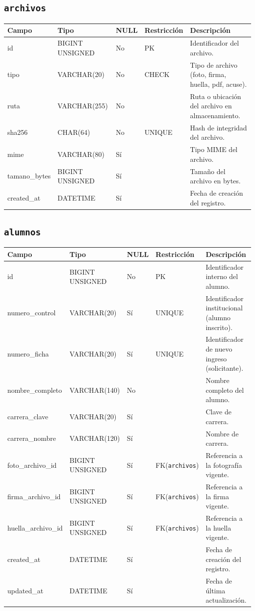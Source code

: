 \documentclass[12pt,a4paper]{article}
\begin{document}
\subsection{\texttt{archivos}}
\begin{longtable}{L{3.2cm} L{3.2cm} C{1.2cm} L{2.6cm} L{5.2cm}}
\toprule
\textbf{Campo} & \textbf{Tipo} & \textbf{NULL} & \textbf{Restricción} & \textbf{Descripción} \\
\midrule
\endhead
id & BIGINT UNSIGNED & No & PK & Identificador del archivo. \\
tipo & VARCHAR(20) & No & CHECK & Tipo de archivo (foto, firma, huella, pdf, acuse). \\
ruta & VARCHAR(255) & No &  & Ruta o ubicación del archivo en almacenamiento. \\
sha256 & CHAR(64) & No & UNIQUE & Hash de integridad del archivo. \\
mime & VARCHAR(80) & Sí &  & Tipo MIME del archivo. \\
tamano\_bytes & BIGINT UNSIGNED & Sí &  & Tamaño del archivo en bytes. \\
created\_at & DATETIME & Sí &  & Fecha de creación del registro. \\
\bottomrule
\end{longtable}

\subsection{\texttt{alumnos}}
\begin{longtable}{L{3.2cm} L{3.2cm} C{1.2cm} L{2.6cm} L{5.2cm}}
\toprule
\textbf{Campo} & \textbf{Tipo} & \textbf{NULL} & \textbf{Restricción} & \textbf{Descripción} \\
\midrule
\endhead
id & BIGINT UNSIGNED & No & PK & Identificador interno del alumno. \\
numero\_control & VARCHAR(20) & Sí & UNIQUE & Identificador institucional (alumno inscrito). \\
numero\_ficha & VARCHAR(20) & Sí & UNIQUE & Identificador de nuevo ingreso (solicitante). \\
nombre\_completo & VARCHAR(140) & No &  & Nombre completo del alumno. \\
carrera\_clave & VARCHAR(20) & Sí &  & Clave de carrera. \\
carrera\_nombre & VARCHAR(120) & Sí &  & Nombre de carrera. \\
foto\_archivo\_id & BIGINT UNSIGNED & Sí & FK(\texttt{archivos}) & Referencia a la fotografía vigente. \\
firma\_archivo\_id & BIGINT UNSIGNED & Sí & FK(\texttt{archivos}) & Referencia a la firma vigente. \\
huella\_archivo\_id & BIGINT UNSIGNED & Sí & FK(\texttt{archivos}) & Referencia a la huella vigente. \\
created\_at & DATETIME & Sí &  & Fecha de creación del registro. \\
updated\_at & DATETIME & Sí &  & Fecha de última actualización. \\
\bottomrule
\end{longtable}
\end{document}
